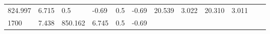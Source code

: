 \documentclass{article}
\begin{document}
\begin{longtable}[]{@{}llllllllllll@{}}
\begin{minipage}[t]{0.06\columnwidth}
824.997\strut
\end{minipage} & \begin{minipage}[t]{0.08\columnwidth}\raggedright\strut
6.715\strut
\end{minipage} & \begin{minipage}[t]{0.03\columnwidth}\raggedright\strut
0.5\strut
\end{minipage} & \begin{minipage}[t]{0.06\columnwidth}\raggedright\strut
-0.69\strut
\end{minipage} & \begin{minipage}[t]{0.03\columnwidth}\raggedright\strut
0.5\strut
\end{minipage} & \begin{minipage}[t]{0.06\columnwidth}\raggedright\strut
-0.69\strut
\end{minipage} & \begin{minipage}[t]{0.06\columnwidth}\raggedright\strut
20.539\strut
\end{minipage} & \begin{minipage}[t]{0.08\columnwidth}\raggedright\strut
3.022\strut
\end{minipage} & \begin{minipage}[t]{0.06\columnwidth}\raggedright\strut
20.310\strut
\end{minipage} & \begin{minipage}[t]{0.09\columnwidth}\raggedright\strut
3.011\strut
\end{minipage}\tabularnewline
\begin{minipage}[t]{0.03\columnwidth}\raggedright\strut
1700\strut
\end{minipage} & \begin{minipage}[t]{0.06\columnwidth}\raggedright\strut
7.438\strut
\end{minipage} & \begin{minipage}[t]{0.06\columnwidth}\raggedright\strut
850.162\strut
\end{minipage} & \begin{minipage}[t]{0.08\columnwidth}\raggedright\strut
6.745\strut
\end{minipage} & \begin{minipage}[t]{0.03\columnwidth}\raggedright\strut
0.5\strut
\end{minipage} & \begin{minipage}[t]{0.06\columnwidth}\raggedright\strut
-0.69\strut
\end{minipage} & \begin{minipage}[t]{0.03\columnwidth}\raggedright\strut

\end{minipage}
\end{longtable}
\end{document}
